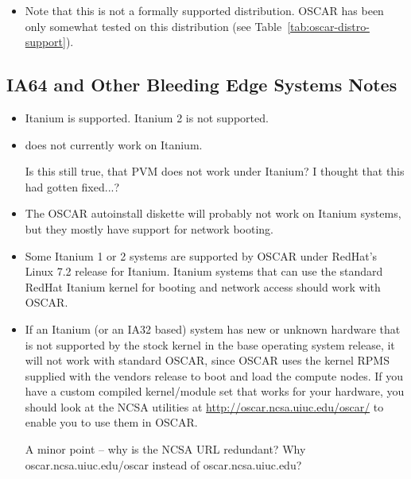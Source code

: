 \begin{itemize}
\item Note that this is not a formally supported distribution.  OSCAR
  \oscarversion\- has been only somewhat tested on this distribution
  (see Table~\ref{tab:oscar-distro-support}).
\end{itemize}


\subsection{IA64 and Other Bleeding Edge Systems Notes}
\label{subsec:ia64notes}

\begin{itemize}

\item Itanium is supported.  Itanium 2 is not supported.

\item {} does not currently work on Itanium.

\begin{discuss}
  Is this still true, that PVM does not work under Itanium?  I thought
  that this had gotten fixed...?
\end{discuss}

\item The OSCAR autoinstall diskette will probably not work
on Itanium systems, but they mostly have support for network booting.

\item Some Itanium 1 or 2 systems are supported by OSCAR 
under RedHat's Linux 7.2 release for Itanium.
Itanium systems that can use the standard RedHat Itanium
kernel for booting and network access should work with OSCAR.

\item If an Itanium (or an IA32 based) system 
has new or unknown hardware that is not supported by
the stock kernel in the base operating system release,
it will not work with standard OSCAR, since OSCAR uses the
kernel RPMS supplied with the vendors release to boot and
load the compute nodes.
If you have a custom compiled kernel/module set that works
for your hardware, you should look at the NCSA utilities
at \url{http://oscar.ncsa.uiuc.edu/oscar/} to enable you
to use them in OSCAR.


\begin{discuss}
  A minor point -- why is the NCSA URL redundant?  Why
  oscar.ncsa.uiuc.edu/oscar instead of oscar.ncsa.uiuc.edu?
\end{discuss}

\end{itemize}




